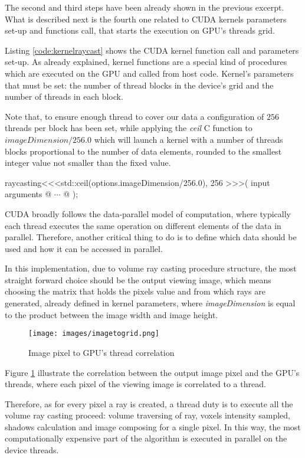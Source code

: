 \documentclass[12pt,a4paper]{extarticle}
\newcommand{\linespace}{\vspace{8pt}}
\begin{document}
The second and third steps have been already shown in the previous excerpt. What is described next is the fourth one related to CUDA kernels parameters set-up and functions call, that starts the execution on GPU's threads grid.
\linespace

Listing \ref{code:kernelraycast} shows the CUDA kernel function call and parameters set-up. As already explained, kernel functions are a special kind of procedures which are executed on the GPU and called from host code. Kernel's parameters that must be set: the number of thread blocks in the device's grid and the number of threads in each block. 

Note that, to ensure enough thread to cover our data a configuration of $256$ threads per block has been set, while applying the \textit{ceil} C function to $imageDimension/256.0$ which will launch a kernel with a number of threads blocks proportional to the number of data elements, rounded to the smallest integer value not smaller than the fixed value.

\begin{cpp}[label=code:kernelraycast]
raycasting<<<std::ceil(options.imageDimension/256.0), 256 >>>( 
	input arguments @ $\cdots$ @
	);	
\end{cpp}

CUDA broadly follows the data-parallel model of computation, where typically each thread executes the same operation on different elements of the data in parallel. Therefore, another critical thing to do is to define which data should be used and how it can be accessed in parallel.

In this implementation, due to volume ray casting procedure structure, the most straight forward choice should be the output viewing image, which means choosing the matrix that holds the pixels value and from which rays are generated, already defined in kernel parameters, where \textit{imageDimension} is equal to the product between the image width and image height.

\begin{figure}[hbtp]
\centering
\texttt{[image: images/imagetogrid.png]}
\caption{Image pixel to GPU's thread correlation}
\label{fig:imagetogrid}
\end{figure}

Figure \ref{fig:imagetogrid} illustrate the correlation between the output image pixel and the GPU's threads, where each pixel of the viewing image is correlated to a thread. 

Therefore, as for every pixel a ray is created, a thread duty is to execute all the volume ray casting proceed: volume traversing of ray, voxels intensity sampled, shadows calculation and image composing for a single pixel.
In this way, the most computationally expensive part of the algorithm is executed in parallel on the device threads.
\linespace
\end{document}
